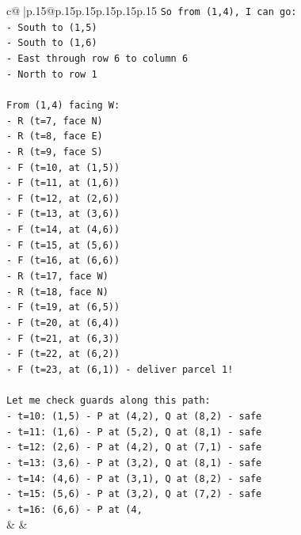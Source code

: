 \documentclass{article}
\begin{document}
{\begin{supertabular}{c@{$\;$}|p{.15\linewidth}@{}p{.15\linewidth}p{.15\linewidth}p{.15\linewidth}p{.15\linewidth}p{.15\linewidth}}
{{{\texttt{So from (1,4), I can go:} \\
\texttt{{-} South to (1,5)} \\
\texttt{{-} South to (1,6)} \\
\texttt{{-} East through row 6 to column 6} \\
\texttt{{-} North to row 1} \\
\\ 
\texttt{From (1,4) facing W:} \\
\texttt{{-} R (t=7, face N)} \\
\texttt{{-} R (t=8, face E)} \\
\texttt{{-} R (t=9, face S)} \\
\texttt{{-} F (t=10, at (1,5))} \\
\texttt{{-} F (t=11, at (1,6))} \\
\texttt{{-} F (t=12, at (2,6))} \\
\texttt{{-} F (t=13, at (3,6))} \\
\texttt{{-} F (t=14, at (4,6))} \\
\texttt{{-} F (t=15, at (5,6))} \\
\texttt{{-} F (t=16, at (6,6))} \\
\texttt{{-} R (t=17, face W)} \\
\texttt{{-} R (t=18, face N)} \\
\texttt{{-} F (t=19, at (6,5))} \\
\texttt{{-} F (t=20, at (6,4))} \\
\texttt{{-} F (t=21, at (6,3))} \\
\texttt{{-} F (t=22, at (6,2))} \\
\texttt{{-} F (t=23, at (6,1)) {-} deliver parcel 1!} \\
\\ 
\texttt{Let me check guards along this path:} \\
\texttt{{-} t=10: (1,5) {-} P at (4,2), Q at (8,2) {-} safe} \\
\texttt{{-} t=11: (1,6) {-} P at (5,2), Q at (8,1) {-} safe} \\
\texttt{{-} t=12: (2,6) {-} P at (4,2), Q at (7,1) {-} safe} \\
\texttt{{-} t=13: (3,6) {-} P at (3,2), Q at (8,1) {-} safe} \\
\texttt{{-} t=14: (4,6) {-} P at (3,1), Q at (8,2) {-} safe} \\
\texttt{{-} t=15: (5,6) {-} P at (3,2), Q at (7,2) {-} safe} \\
\texttt{{-} t=16: (6,6) {-} P at (4,} \\
            }
        }
    }
    & & \\ \\


\end{supertabular}}
\end{document}
